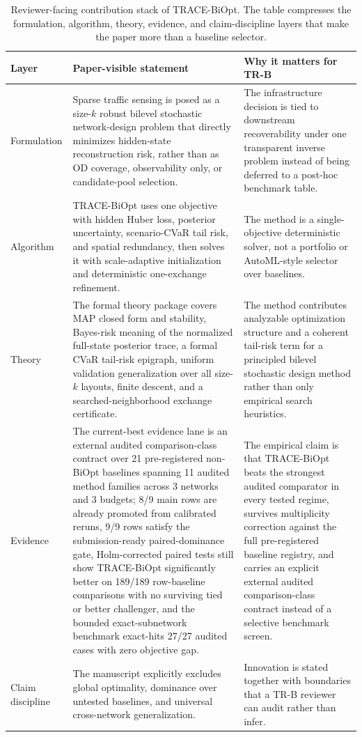 \begin{table}[pos=htbp]
\centering
\caption{Reviewer-facing contribution stack of TRACE-BiOpt. The table compresses the formulation, algorithm, theory, evidence, and claim-discipline layers that make the paper more than a baseline selector.}
\label{tab:trace-biopt-contribution-stack}
\small
\begin{tabularx}{\textwidth}{>{\raggedright\arraybackslash}p{}>{\raggedright\arraybackslash}p{}>{\raggedright\arraybackslash}X}
\toprule
Layer & Paper-visible statement & Why it matters for TR-B \\
\midrule
Formulation & Sparse traffic sensing is posed as a size-$k$ robust bilevel stochastic network-design problem that directly minimizes hidden-state reconstruction risk, rather than as OD coverage, observability only, or candidate-pool selection. & The infrastructure decision is tied to downstream recoverability under one transparent inverse problem instead of being deferred to a post-hoc benchmark table. \\
Algorithm & TRACE-BiOpt uses one objective with hidden Huber loss, posterior uncertainty, scenario-CVaR tail risk, and spatial redundancy, then solves it with scale-adaptive initialization and deterministic one-exchange refinement. & The method is a single-objective deterministic solver, not a portfolio or AutoML-style selector over baselines. \\
Theory & The formal theory package covers MAP closed form and stability, Bayes-risk meaning of the normalized full-state posterior trace, a formal CVaR tail-risk epigraph, uniform validation generalization over all size-$k$ layouts, finite descent, and a searched-neighborhood exchange certificate. & The method contributes analyzable optimization structure and a coherent tail-risk term for a principled bilevel stochastic design method rather than only empirical search heuristics. \\
Evidence & The current-best evidence lane is an external audited comparison-class contract over 21 pre-registered non-BiOpt baselines spanning 11 audited method families across 3 networks and 3 budgets; 8/9 main rows are already promoted from calibrated reruns, 9/9 rows satisfy the submission-ready paired-dominance gate, Holm-corrected paired tests still show TRACE-BiOpt significantly better on 189/189 row-baseline comparisons with no surviving tied or better challenger, and the bounded exact-subnetwork benchmark exact-hits 27/27 audited cases with zero objective gap. & The empirical claim is that TRACE-BiOpt beats the strongest audited comparator in every tested regime, survives multiplicity correction against the full pre-registered baseline registry, and carries an explicit external audited comparison-class contract instead of a selective benchmark screen. \\
Claim discipline & The manuscript explicitly excludes global optimality, dominance over untested baselines, and universal cross-network generalization. & Innovation is stated together with boundaries that a TR-B reviewer can audit rather than infer. \\
\bottomrule
\end{tabularx}
\end{table}
